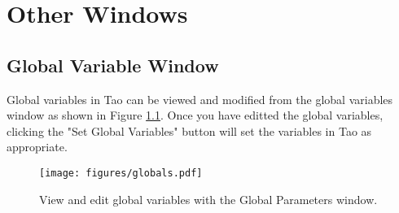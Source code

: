 \chapter{Other Windows}

\section{Global Variable Window}
\label{s:gui.global.variables}

Global variables in Tao can be viewed and modified from the global variables window as shown in Figure \ref{fig:gui.global.variables}.
Once you have editted the global variables, clicking the "Set Global Variables" button will set the variables in Tao as appropriate.

\begin{figure}
\centering
\texttt{[image: figures/globals.pdf]}
\caption{View and edit global variables with the Global Parameters window.}
\label{fig:gui.global.variables}
\end{figure}
